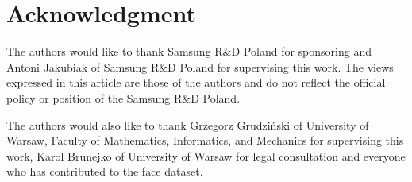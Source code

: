 \chapter*{Acknowledgment}
The authors would like to thank
Samsung R\&D Poland for sponsoring and Antoni Jakubiak of Samsung R\&D Poland
for supervising this work.
The views expressed in this article are those of the
authors and do not reflect the official policy or position of
the Samsung R\&D Poland.

\bigskip
The authors would also like to thank Grzegorz Grudziński of University of Warsaw,
Faculty of Mathematics, Informatics, and Mechanics for supervising this work,
Karol Brunejko of University of Warsaw for legal consultation and everyone who
has contributed to the face dataset.
